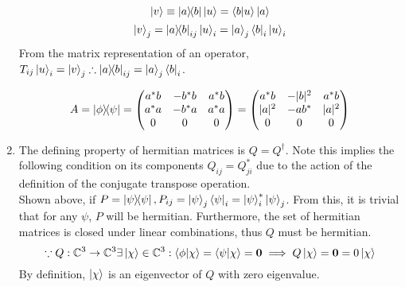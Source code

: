 \begin{sol}
\begin{enumerate}[label=\textbf{(\alph*)}]
\begin{equation}
	\ket v\equiv\ketbra{a}{b}\ket{u}=\braket{b}{u}\ket{a}
\end{equation} 
\begin{equation}
	\ket v_j=\ketbra{a}{b}_{ij}\ket{u}_i=\ket a_j\bra b_i\ket u_i
\end{equation} 
From the matrix representation of an operator, $T_{ij}\ket u_i=\ket v_j\therefore\ketbra{a}{b}_{ij}=\ket a_j\bra b_i$.


\begin{equation}
	A=\ketbra{\phi}{\psi}=\begin{pmatrix}
a^*b&-b^*b&a^*b\\
a^*a&-b^*a&a^*a\\
0&0&0 
\end{pmatrix}=\begin{pmatrix}
a^*b&-|b|^2&a^*b\\
|a|^2&-ab^*&|a|^2\\
0&0&0 
\end{pmatrix}
\end{equation}
\item 
The defining property of hermitian matrices is $Q=Q^\dagger$. Note this implies the following condition on its components $Q_{ij}=Q_{ji}^*$ due to the action of the definition of the conjugate transpose operation.\\
Shown above, if $P=\ketbra{\psi}{\psi}, P_{ij}=\ket\psi_j\bra\psi_i=\ket\psi_i^*\ket\psi_j$. From this, it is trivial that for any $\psi$, $P$ will be hermitian. Furthermore, the set of hermitian matrices is closed under linear combinations, thus $Q$ must be hermitian.
\begin{equation}
	\because Q:\mathbb C^3\to\mathbb C^3\exists\ket{\chi}\in\mathbb C^3:\braket{\phi}{\chi}=\braket{\psi}{\chi}=\mathbf 0\implies Q\ket{\chi}=\mathbf{0}=0\ket{\chi}
\end{equation}  
By definition, $\ket{\chi}$ is an eigenvector of $Q$ with zero eigenvalue.
\end{enumerate}
\end{sol}